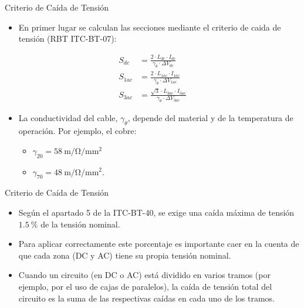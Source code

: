 \documentclass[aspectratio=169, usenames,svgnames,dvipsnames]{beamer}
\begin{document}
\begin{frame}[label={sec:org146ef73}]{Criterio de Caída de Tensión}
\begin{itemize}
\item En primer lugar se calculan las secciones mediante el criterio de caida de tensión (RBT ITC-BT-07):
\end{itemize}

\begin{align*}
    S_{dc} &=  \frac{2 \cdot L_{dc}\cdot I_{dc}}{\gamma_\theta \cdot \Delta V_{dc}}\\
    S_{1ac} &=  \frac{2\cdot L_{1ac}\cdot I_{1ac}}{\gamma_\theta \cdot \Delta V_{1ac}}\\
    S_{3ac} &= \frac{\sqrt{3} \cdot L_{3ac}\cdot I_{3ac}}{\gamma_\theta \cdot \Delta V_{3ac}}
  \end{align*}

\begin{itemize}
\item La conductividad del cable, \(\gamma_\theta\), depende del material y de la
temperatura de operación. Por ejemplo, el cobre:
\begin{itemize}
\item \(\gamma_{20} = \qty{58}{\meter\per\ohm\per\milli\meter\squared}\)
\item \(\gamma_{70} = \qty{48}{\meter\per\ohm\per\milli\meter\squared}\).
\end{itemize}
\end{itemize}
\end{frame}

\begin{frame}[label={sec:org0d24f9e}]{Criterio de Caída de Tensión}
\begin{itemize}
\item Según el apartado 5 de la ITC-BT-40, se exige una caída máxima de
tensión \(\qty{1.5}{\percent}\) de la tensión nominal.

\item Para aplicar correctamente este porcentaje es importante caer en la
cuenta de que \alert{cada zona (DC y AC) tiene su propia tensión nominal}.

\item Cuando un circuito (en DC o AC) está dividido en varios tramos (por
ejemplo, por el uso de cajas de paralelos), la caída de tensión
total del circuito es la suma de las respectivas caídas en cada uno
de los tramos.
\end{itemize}
\end{frame}
\end{document}

